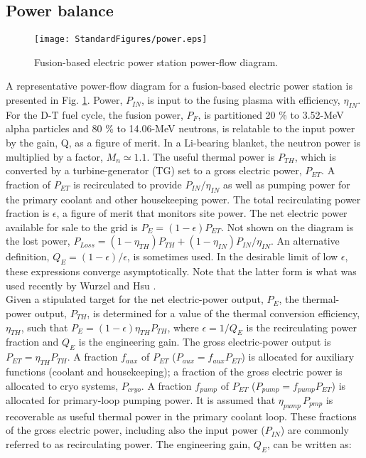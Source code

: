 \subsection{Power balance} 
\begin{figure}[h!] 
\centering 
\texttt{[image: StandardFigures/power.eps]} 
\caption{Fusion-based electric power station power-flow diagram.}
\label{fig:pwr} 
\end{figure} 
A representative power-flow diagram for a fusion-based electric power station is presented in Fig. \ref{fig:pwr}. Power, $P_{IN}$, is input to the fusing plasma with efficiency, $\eta_{IN}$. For the D-T fuel cycle, the fusion power, $P_{F}$, is partitioned 20 \% to 3.52-MeV alpha particles and 80 \% to 14.06-MeV neutrons, is relatable to the input power by the gain, Q, as a figure of merit. In a Li-bearing blanket, the neutron power is multiplied by a factor, $M_{n} \simeq 1.1$.  The useful thermal power is $P_{TH}$, which is converted by a turbine-generator (TG) set to a gross electric power, $P_{ET}$.  A fraction of $P_{ET}$ is recirculated to provide $P_{IN}/\eta_{IN}$ as well as pumping power for the primary coolant and other housekeeping power.  The total recirculating power fraction is $\epsilon$, a figure of merit that monitors site power. The net electric power available for sale to the grid is $P_{E} = (1 - \epsilon)P_{ET}$. Not shown on the diagram is the lost power, $P_{Loss} = (1 - \eta_{TH})P_{TH} + (1 - \eta_{IN})P_{IN}/\eta_{IN}$. An alternative definition, $Q_{E} = (1 - \epsilon)/\epsilon$, is sometimes used.  In the desirable limit of low $\epsilon$, these expressions converge asymptotically. Note that the latter form is what was used recently by Wurzel and Hsu \cite{Wurzel2022}. \\

Given a stipulated target for the net electric-power output, $P_E$, the thermal-power output, $P_{TH}$, is determined for a value of the thermal conversion efficiency, $\eta_{TH}$, such that \hbox{$P_E = (1-\epsilon) \eta_{TH} P_{TH}$}, where \hbox{$\epsilon = 1/Q_E$} is the recirculating power fraction and $Q_E$ is the engineering gain.   The gross electric-power output is \hbox{$P_{ET} =\eta_{TH} P_{TH}$}. A fraction $f_{aux}$ of $P_{ET}$ ($P_{aux} = f_{aux} P_{ET}$) is allocated  for auxiliary functions (coolant and housekeeping); a fraction of the gross electric power is allocated to cryo systems, $P_{cryo}$. A fraction  $f_{pump}$ of $P_{ET}$ (\hbox{$P_{pump} = f_{pump} P_{ET}$}) is allocated for primary-loop pumping power. It is assumed that \hbox{$\eta_{pump}  \, P_{pmp}$} is recoverable as useful thermal power in the primary coolant loop.  These fractions of the gross electric power, including also the input power ($P_{IN}$) are commonly referred to as recirculating power. The engineering gain, $Q_E$, can be written as: 


